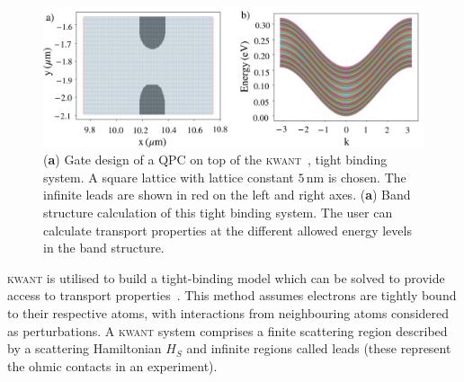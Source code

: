 \begin{figure}[!bht]
 \begin{center}
 \includegraphics[width=1.0\textwidth]{figures/appendix/appendix2_kwant.pdf}
 \caption[\textsc{kwant} : Tight Binding Model]{\label{fig:appx/kwant_tightbind} 
 (\textbf{a}) Gate design of a QPC on top of the \textsc{kwant}~\cite{kwant}, tight binding system. A square lattice with lattice constant $5\,\mathrm{nm}$ is chosen. The infinite leads are shown in red on the left and right axes. (\textbf{a}) Band structure calculation of this tight binding system. The user can calculate transport properties at the different allowed energy levels in the band structure.}
 \end{center}
\end{figure}





\textsc{kwant} is utilised to build a tight-binding model which can be solved to provide access to transport properties~\cite{kwant}. This method assumes electrons are tightly bound to their respective atoms, with interactions from neighbouring atoms considered as perturbations. A \textsc{kwant} system comprises a finite scattering region described by a scattering Hamiltonian $H_S$ and infinite regions called leads (these represent the ohmic contacts in an experiment).


